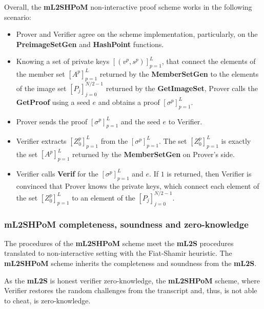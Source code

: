 \documentclass{mathcryptology} %
\theoremstyle{title}
\theoremstyle{titleof}
\begin{document}
    Overall, the \textbf{mL2SHPoM} non-interactive proof scheme works in the following scenario:
    \begin{itemize}
        \item Prover and Verifier agree on the scheme implementation, particularly, on the \textbf{PreimageSetGen} and  \textbf{HashPoint} functions.
        \item Knowing a set of private keys ${\left[\left(v^{p},s^{p}\right)\right]}_{p=1}^{L}$, that connect the elements of the member set ${\left[A^{p}\right]}_{p=1}^{L}$ returned by the \textbf{MemberSetGen} to the elements of the image set ${\left[P_{j}\right]}_{j=0}^{N/2-1}$ returned by the \textbf{GetImageSet}, Prover calls the \textbf{GetProof} using a seed $e$ and obtains a proof ${\left[\sigma^{p}\right]}_{p=1}^{L}$.
        \item Prover sends the proof ${\left[\sigma^{p}\right]}_{p=1}^{L}$ and the seed $e$ to Verifier.
        \item Verifier extracts ${\left[Z_{0}^{p}\right]}_{p=1}^{L}$ from the ${\left[\sigma^{p}\right]}_{p=1}^{L}$. The set ${\left[Z_{0}^{p}\right]}_{p=1}^{L}$ is exactly the set ${\left[A^{p}\right]}_{p=1}^{L}$ returned by the \textbf{MemberSetGen} on Prover's side.
        \item Verifier calls \textbf{Verif} for the ${\left[\sigma^{p}\right]}_{p=1}^{L}$ and $e$. If $1$ is returned, then Verifier is convinced that Prover knows the private keys, which connect each element of the set ${\left[Z_{0}^{p}\right]}_{p=1}^{L}$ to an element of the ${\left[P_{j}\right]}_{j=0}^{N/2-1}$.
    \end{itemize}


\subsubsection{mL2SHPoM completeness, soundness and zero-knowledge}\label{Sec:8.2.3.}
    The procedures of the \textbf{mL2SHPoM} scheme meet the \textbf{mL2S} procedures translated to non-interactive setting with the Fiat-Shamir heuristic.
    The \textbf{mL2SHPoM} scheme inherits the completeness and soundness from the \textbf{mL2S}.

    As the \textbf{mL2S} is honest verifier zero-knowledge, the \textbf{mL2SHPoM} scheme, where Verifier restores the random challenges from the transcript and, thus, is not able to cheat, is zero-knowledge.
\end{document}
